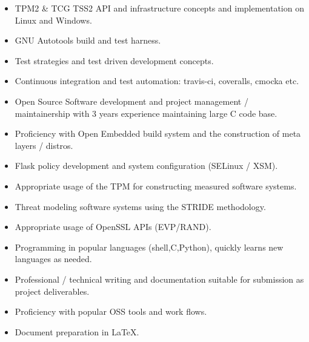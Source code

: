 \documentclass[letterpaper,11pt]{article}
\begin{document}
    \begin {itemize}
      \setlength {\itemsep}{1pt}
      \setlength {\parskip}{0pt}
      \setlength {\parsep}{0pt}
      \item TPM2 \& TCG TSS2 API and infrastructure concepts and implementation
          on Linux and Windows.
      \item GNU Autotools build and test harness.
      \item Test strategies and test driven development concepts.
      \item Continuous integration and test automation: travis-ci, coveralls,
          cmocka etc.
      \item Open Source Software development and project management /
          maintainership with 3 years experience maintaining large C code
          base.
      \item Proficiency with Open Embedded build system and the construction of meta layers / distros.
      \item Flask policy development and system configuration (SELinux / XSM).
      \item Appropriate usage of the TPM for constructing measured software systems.
      \item Threat modeling software systems using the STRIDE methodology.
      \item Appropriate usage of OpenSSL APIs (EVP/RAND).
      \item Programming in popular languages (shell,C,Python), quickly learns new languages as needed.
      \item Professional / technical writing and documentation suitable for submission as project deliverables.
      \item Proficiency with popular OSS tools and work flows.
      \item Document preparation in \LaTeX.
    \end {itemize}
\end{document}
